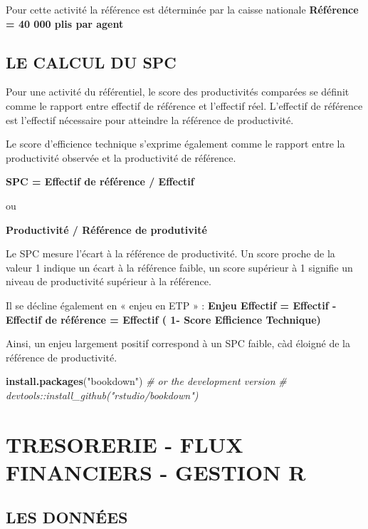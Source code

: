 \documentclass[
]{book}
\newenvironment{Shaded}{\begin{snugshade}}{\end{snugshade}}
\newcommand{\CommentTok}[1]{\textcolor[rgb]{0.56,0.35,0.01}{\textit{#1}}}
\newcommand{\KeywordTok}[1]{\textcolor[rgb]{0.13,0.29,0.53}{\textbf{#1}}}
\newcommand{\NormalTok}[1]{#1}
\newcommand{\StringTok}[1]{\textcolor[rgb]{0.31,0.60,0.02}{#1}}
\begin{document}
Pour cette activité la référence est déterminée par la caisse nationale
\textbf{Référence = 40 000 plis par agent}

\hypertarget{le-calcul-du-spc}{%
\section{LE CALCUL DU SPC}\label{le-calcul-du-spc}}

Pour une activité du référentiel, le score des productivités comparées se définit comme le rapport entre effectif de référence et l'effectif réel. L'effectif de référence est l'effectif nécessaire pour atteindre la référence de productivité.

Le score d'efficience technique s'exprime également comme le rapport entre la productivité observée et la productivité de référence.

\textbf{SPC = Effectif de référence / Effectif}

ou

\textbf{Productivité / Référence de produtivité}

Le SPC mesure l'écart à la référence de productivité. Un score proche de la valeur 1 indique un écart à la référence faible, un score supérieur à 1 signifie un niveau de productivité supérieur à la référence.

Il se décline également en « enjeu en ETP » :
\textbf{Enjeu Effectif = Effectif - Effectif de référence = Effectif ( 1- Score Efficience Technique)}

Ainsi, un enjeu largement positif correspond à un SPC faible, càd éloigné de la référence de productivité.

\begin{Shaded}
\begin{Highlighting}[]
\KeywordTok{install.packages}\NormalTok{(}\StringTok{"bookdown"}\NormalTok{)}
\CommentTok{# or the development version}
\CommentTok{# devtools::install_github("rstudio/bookdown")}
\end{Highlighting}
\end{Shaded}

\hypertarget{tresorerie---flux-financiers---gestion-r}{%
\chapter{TRESORERIE - FLUX FINANCIERS - GESTION R}\label{tresorerie---flux-financiers---gestion-r}}

\hypertarget{les-donnuxe9es}{%
\section{LES DONNÉES}\label{les-donnuxe9es}}
\end{document}
